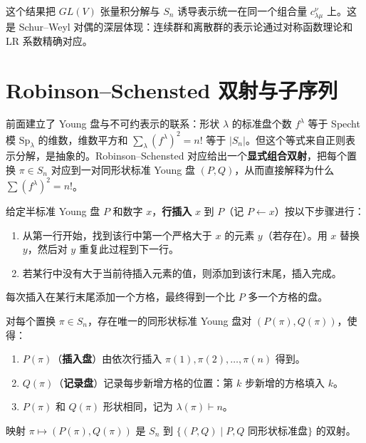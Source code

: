 这个结果把 $GL(V)$ 张量积分解与 $S_n$ 诱导表示统一在同一个组合量 $c_{\lambda\mu}^\nu$ 上。这是 Schur--Weyl 对偶的深层体现：连续群和离散群的表示论通过对称函数理论和 LR 系数精确对应。

\section{Robinson--Schensted 双射与子序列}

前面建立了 Young 盘与不可约表示的联系：形状 $\lambda$ 的标准盘个数 $f^\lambda$ 等于 Specht 模 $\mathrm{Sp}_\lambda$ 的维数，维数平方和 $\sum_\lambda(f^\lambda)^2=n!$ 等于 $|S_n|$。但这个等式来自正则表示分解，是抽象的。Robinson--Schensted 对应给出一个\textbf{显式组合双射}，把每个置换 $\pi\in S_n$ 对应到一对同形状标准 Young 盘 $(P,Q)$，从而直接解释为什么 $\sum(f^\lambda)^2=n!$。

\begin{definition}[行插入算法]
给定半标准 Young 盘 $P$ 和数字 $x$，\textbf{行插入} $x$ 到 $P$（记 $P\leftarrow x$）按以下步骤进行：
\begin{enumerate}
\item 从第一行开始，找到该行中第一个严格大于 $x$ 的元素 $y$（若存在）。用 $x$ 替换 $y$，然后对 $y$ 重复此过程到下一行。
\item 若某行中没有大于当前待插入元素的值，则添加到该行末尾，插入完成。
\end{enumerate}
每次插入在某行末尾添加一个方格，最终得到一个比 $P$ 多一个方格的盘。
\end{definition}

\begin{theorem}
\label{thm:rs-correspondence}
对每个置换 $\pi\in S_n$，存在唯一的同形状标准 Young 盘对 $(P(\pi),Q(\pi))$，使得：
\begin{enumerate}[label=(\roman*),leftmargin=3em]
\item $P(\pi)$（\textbf{插入盘}）由依次行插入 $\pi(1),\pi(2),\dots,\pi(n)$ 得到。
\item $Q(\pi)$（\textbf{记录盘}）记录每步新增方格的位置：第 $k$ 步新增的方格填入 $k$。
\item $P(\pi)$ 和 $Q(\pi)$ 形状相同，记为 $\lambda(\pi)\vdash n$。
\end{enumerate}
映射 $\pi\mapsto(P(\pi),Q(\pi))$ 是 $S_n$ 到 $\{(P,Q)\mid P,Q\text{ 同形状标准盘}\}$ 的双射。
\end{theorem}

